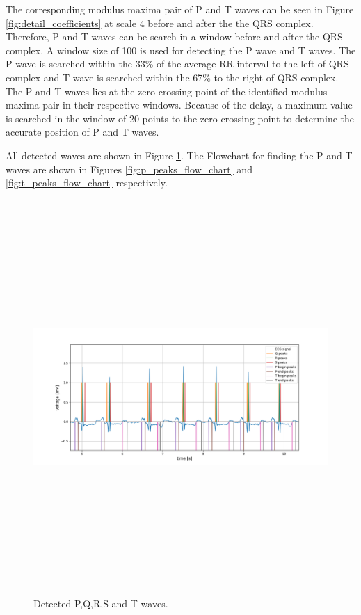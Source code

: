 The corresponding modulus maxima pair of P and T waves can be seen in Figure \ref{fig:detail_coefficients} at scale 4 before and after the the QRS complex. Therefore, P and T waves can be search in a window before and after the QRS complex.
A window size of 100 is used for detecting the P wave and T waves. The P wave is searched within the 33\% of the average RR interval to the left of QRS complex and T wave is searched within the 67\% to the right of QRS complex. The P and T waves lies at the zero-crossing point of the identified modulus maxima pair in their respective windows. Because of the delay, a maximum value is searched in the window of 20 points to the zero-crossing point to determine the accurate position of P and T waves.

All detected waves are shown in Figure \ref{fig:pqrst}. The Flowchart for finding the P and T waves are shown in Figures \ref{fig:p_peaks_flow_chart} and \ref{fig:t_peaks_flow_chart} respectively.


\begin{figure}[htpb]
	\centering
	\includegraphics[width=15cm,height=15cm,keepaspectratio=true]{images/pqrst}
	\caption{
		Detected P,Q,R,S and T waves.
	}
	\label{fig:pqrst}
\end{figure}



